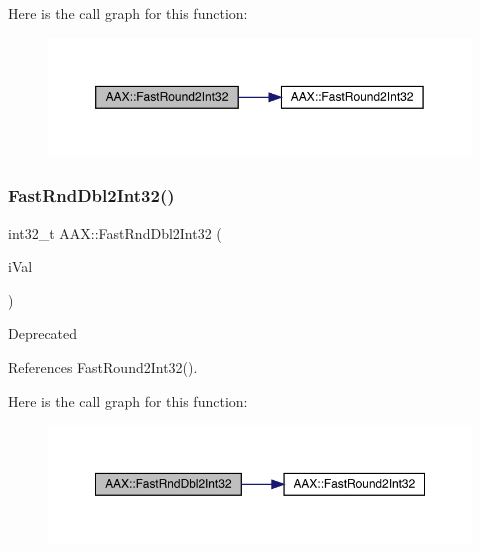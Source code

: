 Here is the call graph for this function\+:
\nopagebreak
\begin{figure}[H]
\begin{center}
\leavevmode
\includegraphics[width=350pt]{a00852_a56cd923aeae2bd544f1fb43fff6b0b3d_cgraph}
\end{center}
\end{figure}
\mbox{\label{a00852_ae690c060a5ff4cb96e77335231a29673}} 
\subsubsection{\texorpdfstring{FastRndDbl2Int32()}{FastRndDbl2Int32()}}
{\footnotesize\ttfamily int32\+\_\+t A\+A\+X\+::\+Fast\+Rnd\+Dbl2\+Int32 (\begin{DoxyParamCaption}\item[{double}]{i\+Val }\end{DoxyParamCaption})\hspace{0.3cm}{\ttfamily [inline]}}

\begin{DoxyRefDesc}{Deprecated}
\item[\mbox{\hyperlink{a00788__deprecated000019}{Deprecated}}]\end{DoxyRefDesc}


References Fast\+Round2\+Int32().

Here is the call graph for this function\+:
\nopagebreak
\begin{figure}[H]
\begin{center}
\leavevmode
\includegraphics[width=350pt]{a00852_ae690c060a5ff4cb96e77335231a29673_cgraph}
\end{center}
\end{figure}
\mbox{\label{a00852_ad2b2872b49146cf0859c403fea702a39}} 
